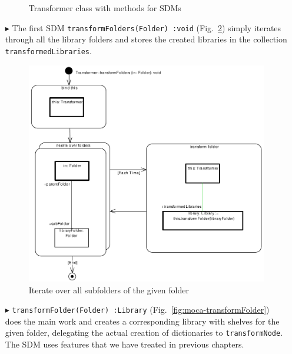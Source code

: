 \begin{enumerate}
\begin{figure}[!htbp]
\begin{center}
  \caption{Transformer class with methods for SDMs}
  \label{fig:moca-DictionaryCodeAdapter}
\end{center}
\end{figure}
\item[$\blacktriangleright$] The first SDM \texttt{transformFolders(Folder)~:void} (Fig.~\ref{fig:moca-transformFolders}) simply iterates through all the library folders and stores the created libraries in the collection \texttt{transformedLibraries}.
\begin{figure}[!htbp]
\begin{center}
 \includegraphics[width=\textwidth]{pics/moca/3MocaTreeToModel/transformFolders}
  \caption{Iterate over all subfolders of the given folder}
  \label{fig:moca-transformFolders}
\end{center}
\end{figure}
\item[$\blacktriangleright$]  \texttt{transformFolder(Folder)~:Library} (Fig.~\ref{fig:moca-transformFolder}) does the main work and creates a corresponding library with shelves for the given folder, delegating the actual creation of dictionaries to \texttt{transformNode}.
The SDM uses features that we have treated in previous chapters.


\end{enumerate}
